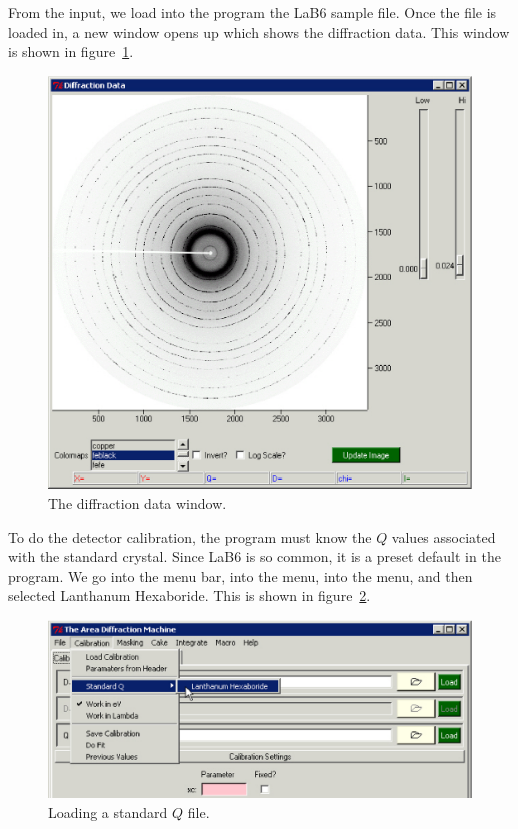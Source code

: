 From the  input, we load into the program the LaB6 
sample file. Once the file is loaded in, a new window opens up 
which shows the diffraction data. This window is shown in 
figure~\ref{diffraction_data_window_example}.

\begin{figure}[h]
    \centering
    \includegraphics[scale=.75]{figures/diffraction_data_window_example.eps}
    \caption{The diffraction data window.}
    \label{diffraction_data_window_example}
\end{figure}

To do the detector calibration, the program must know the 
$Q$ values associated 
with the standard crystal. Since LaB6 is so common, it is
a preset default in the program. We go into the menu bar, 
into the  menu, into the  menu, 
and then selected Lanthanum Hexaboride. This is shown
in figure~\ref{standard_q_example}.

\begin{figure}[h]
    \centering
    \includegraphics[scale=.75]{figures/standard_q.eps}
    \caption{Loading a standard $Q$ file.}
    \label{standard_q_example}
\end{figure}

